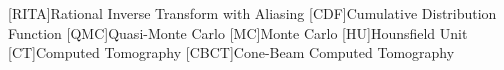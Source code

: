 [RITA]{Rational Inverse Transform with Aliasing}
[CDF]{Cumulative Distribution Function}
[QMC]{Quasi-Monte Carlo}
[MC]{Monte Carlo}
[HU]{Hounsfield Unit}
[CT]{Computed Tomography}
[CBCT]{Cone-Beam Computed Tomography}